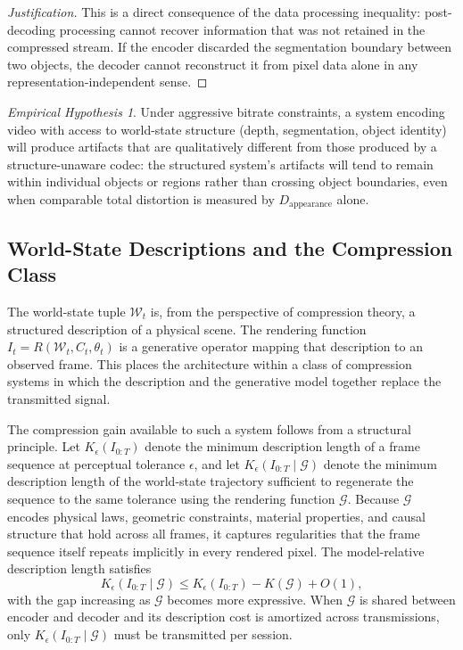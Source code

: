 \documentclass[11pt,a4paper]{article}
\theoremstyle{plain}
\theoremstyle{definition}
\theoremstyle{remark}
\newtheorem{hypothesis}[theorem]{Empirical Hypothesis}
\begin{document}
\begin{proof}[Justification]
This is a direct consequence of the data processing inequality: post-decoding processing cannot recover information that was not retained in the compressed stream. If the encoder discarded the segmentation boundary between two objects, the decoder cannot reconstruct it from pixel data alone in any representation-independent sense.
\end{proof}

\begin{hypothesis}
\label{hyp:structure-ratedistortion}
Under aggressive bitrate constraints, a system encoding video with access to world-state structure (depth, segmentation, object identity) will produce artifacts that are qualitatively different from those produced by a structure-unaware codec: the structured system's artifacts will tend to remain within individual objects or regions rather than crossing object boundaries, even when comparable total distortion is measured by $D_{\mathrm{appearance}}$ alone.
\end{hypothesis}


\subsection{World-State Descriptions and the Compression Class}

The world-state tuple $\mathcal{W}_t$ is, from the perspective of compression theory, a structured description of a physical scene. The rendering function $I_t = R(\mathcal{W}_t, C_t, \theta_t)$ is a generative operator mapping that description to an observed frame. This places the architecture within a class of compression systems in which the description and the generative model together replace the transmitted signal.

The compression gain available to such a system follows from a structural principle. Let $K_\epsilon(I_{0:T})$ denote the minimum description length of a frame sequence at perceptual tolerance $\epsilon$, and let $K_\epsilon(I_{0:T} \mid \mathcal{G})$ denote the minimum description length of the world-state trajectory sufficient to regenerate the sequence to the same tolerance using the rendering function $\mathcal{G}$. Because $\mathcal{G}$ encodes physical laws, geometric constraints, material properties, and causal structure that hold across all frames, it captures regularities that the frame sequence itself repeats implicitly in every rendered pixel. The model-relative description length satisfies
\[
K_\epsilon(I_{0:T} \mid \mathcal{G}) \leq K_\epsilon(I_{0:T}) - K(\mathcal{G}) + O(1),
\]
with the gap increasing as $\mathcal{G}$ becomes more expressive. When $\mathcal{G}$ is shared between encoder and decoder and its description cost is amortized across transmissions, only $K_\epsilon(I_{0:T} \mid \mathcal{G})$ must be transmitted per session.
\end{document}
